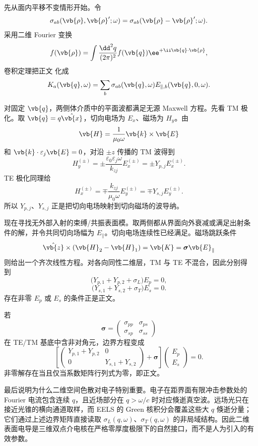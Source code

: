 \begin{derivation}[各向异性导电薄层的模式极点]
先从面内平移不变情形开始。令
\[
\sigma_{ab}(\vb{\rho},\vb{\rho}';\omega)
=
\sigma_{ab}(\vb{\rho}-\vb{\rho}';\omega).
\]
采用二维 Fourier 变换
\[
f(\vb{\rho})
=
\int\frac{\dd^2q}{(2\pi)^2}
f(\vb{q})\ee^{+\ii\vb{q}\cdot\vb{\rho}},
\]
卷积定理把正文 化成
\[
K_a(\vb{q},\omega)
=
\sum_b
\sigma_{ab}(\vb{q},\omega)
E_{\parallel,b}(\vb{q},0,\omega).
\]

对固定 $\vb{q}$，两侧体介质中的平面波都满足无源 Maxwell 方程。先看 TM 极化。取 $\vb{q}=q\hat{\vb{x}}$，切向电场为 $E_x$、磁场为 $H_y$。由
\[
\vb{H}
=
\frac1{\mu_0\omega}\vb{k}\times\vb{E}
\]
和
$\vb{k}\cdot\varepsilon_j\vb{E}=0$，对沿 $\pm z$ 传播的 TM 波得到
\[
H_y^{(\pm)}
=
\pm
\frac{\varepsilon_0\varepsilon_j\omega}{k_{zj}}
E_x^{(\pm)}
=
\pm Y_{p,j}E_x^{(\pm)}.
\]
TE 极化同理给
\[
H_x^{(\pm)}
=
\mp
\frac{k_{zj}}{\mu_0\omega}
E_y^{(\pm)}
=
\mp Y_{s,j}E_y^{(\pm)}.
\]
所以 $Y_{p,j}$、$Y_{s,j}$ 正是把切向电场映射到切向磁场的波导纳。

现在寻找无外部入射的束缚/共振表面模。取两侧都从界面向外衰减或满足出射条件的解，并令共同切向场幅为 $E_\parallel$。切向电场连续性已经满足。磁场跳跃条件
\[
\hat{\vb{z}}\times(\vb{H}_2-\vb{H}_1)
=
\vb{K}
=
\boldsymbol\sigma\vb{E}_\parallel
\]
则给出一个齐次线性方程。对各向同性二维层，TM 与 TE 不混合，因此分别得到
\[
\bigl(Y_{p,1}+Y_{p,2}+\sigma_L\bigr)E_p=0,
\]
\[
\bigl(Y_{s,1}+Y_{s,2}+\sigma_T\bigr)E_s=0.
\]
存在非零 $E_p$ 或 $E_s$ 的条件正是正文。

若
\[
\boldsymbol\sigma
=
\begin{pmatrix}
\sigma_{pp}&\sigma_{ps}\\
\sigma_{sp}&\sigma_{ss}
\end{pmatrix}
\]
在 TE/TM 基底中含非对角元，边界方程变成
\[
\left[
\begin{pmatrix}
Y_{p,1}+Y_{p,2}&0\\
0&Y_{s,1}+Y_{s,2}
\end{pmatrix}
+
\boldsymbol\sigma
\right]
\begin{pmatrix}E_p\\E_s\end{pmatrix}
=0.
\]
非零解存在当且仅当系数矩阵行列式为零，即正文。

最后说明为什么二维空间色散对电子特别重要。电子在距界面有限冲击参数处的 Fourier 电流包含连续 $q$，且近场部分在
$q>\omega/c$ 时对应倏逝真空波。远场光只在接近光锥的横向通道取样，而 EELS 的 Green 核积分会覆盖这些大 $q$ 倏逝分量；它们通过上述边界矩阵直接读取 $\sigma_L(q,\omega)$、$\sigma_T(q,\omega)$ 的非局域结构。因此二维表面电导是三维双点介电核在严格零厚度极限下的自然接口，而不是人为引入的有效参数。


\end{derivation}
